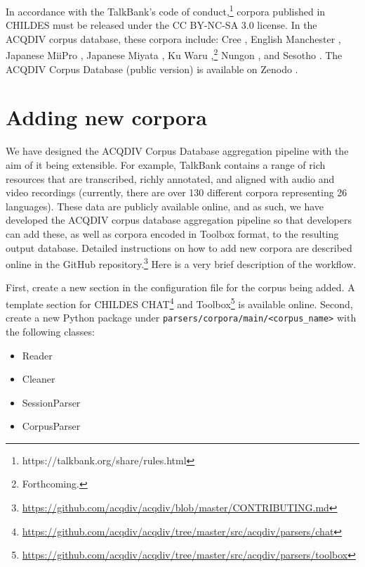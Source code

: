\documentclass[a4paper, 11pt]{book}
\begin{document}
In accordance with the TalkBank's code of conduct,\footnote{https://talkbank.org/share/rules.html} corpora published in CHILDES must be released under the CC BY-NC-SA 3.0 license. In the ACQDIV corpus database, these corpora include: Cree \citep{Brittain2015a}, English Manchester \citep{Theakston_etal2001}, Japanese MiiPro \citep{Miyata_etal2009a,Miyata_etal2010a,Nisisawa_etal2009a,Nisisawa_etal2010a}, Japanese Miyata \citep{Miyata2004a,Miyata2004b,Miyata2004c,Miyata2012a}, Ku Waru \citep{Rumsey_etal2019},\footnote{Forthcoming.} Nungon \citep{Sarvasy2017a}, and Sesotho \citep{Demuth2015a}. The ACQDIV Corpus Database (public  version) is available on Zenodo \citep{Moran_etal2019a}.


\section{Adding new corpora}
\label{sec:Adding new corpora}

We have designed the ACQDIV Corpus Database aggregation pipeline with the aim of it being extensible. For example, TalkBank contains a range of rich resources that are transcribed, richly annotated, and aligned with audio and video recordings (currently, there are over 130 different corpora representing 26 languages). These data are publicly available online, and as such, we have developed the ACQDIV corpus database aggregation pipeline so that developers can add these, as well as corpora encoded in Toolbox format, to the resulting output database. Detailed instructions on how to add new corpora are described online in the GitHub repository.\footnote{\url{https://github.com/acqdiv/acqdiv/blob/master/CONTRIBUTING.md}} Here is a very brief description of the workflow.

First, create a new section in the configuration file for the corpus being added. A template section for CHILDES CHAT\footnote{\url{https://github.com/acqdiv/acqdiv/tree/master/src/acqdiv/parsers/chat}} and Toolbox\footnote{\url{https://github.com/acqdiv/acqdiv/tree/master/src/acqdiv/parsers/toolbox}} is available online. Second, create a new Python package under \texttt{parsers/corpora/main/\textless corpus\_name\textgreater} with the following classes:

\begin{itemize}
    \item Reader
    \item Cleaner
    \item SessionParser
    \item CorpusParser
\end{itemize}
\end{document}
